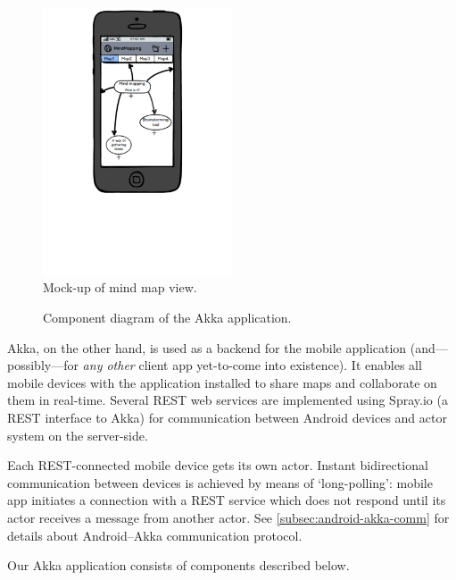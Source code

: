 \begin{figure}[h]
	\centering
	\includegraphics[width=0.5\textwidth]{graphics-mockup-map}
	\caption{Mock-up of mind map view.}
	\label{fig:mockup-mindmap}
\end{figure}


\begin{figure}[h]
	\centering
	\caption{Component diagram of the Akka application.}
	\label{fig:diagram-components-akka}
\end{figure}

Akka, on the other hand, is used as a backend for the mobile application (and---possibly---for \emph{any other} client app yet-to-come into existence). It enables all mobile devices with the application installed to share maps and collaborate on them in real-time. Several REST web services are implemented using Spray.io (a REST interface to Akka) for communication between Android devices and actor system on the server-side.

Each REST-connected mobile device gets its own actor. Instant bidirectional communication between devices is achieved by means of `long-polling': mobile app initiates a connection with a REST service which does not respond until its actor receives a message from another actor. See \cref{subsec:android-akka-comm} for details about Android--Akka communication protocol.

Our Akka application consists of components described below.

